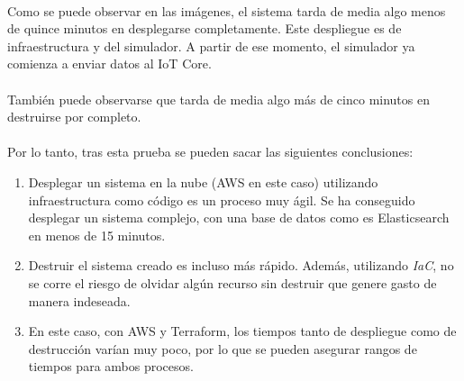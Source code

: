 \documentclass[../../memoria.tex]{subfiles}
\begin{document}
\paragraph{}
Como se puede observar en las imágenes, el sistema tarda de media algo menos de quince minutos en desplegarse completamente. Este despliegue es de infraestructura y del simulador. A partir de ese momento, el simulador ya comienza a enviar datos al IoT Core.

\paragraph{}
También puede observarse que tarda de media algo más de cinco minutos en destruirse por completo.

\paragraph{}
Por lo tanto, tras esta prueba se pueden sacar las siguientes conclusiones:

\begin{enumerate}
    \item Desplegar un sistema en la nube (AWS en este caso) utilizando infraestructura como código es un proceso muy ágil. Se ha conseguido desplegar un sistema complejo, con una base de datos como es Elasticsearch en menos de 15 minutos.
    \item Destruir el sistema creado es incluso más rápido. Además, utilizando \textit{IaC}, no se corre el riesgo de olvidar algún recurso sin destruir que genere gasto de manera indeseada.
    \item En este caso, con AWS y Terraform, los tiempos tanto de despliegue como de destrucción varían muy poco, por lo que se pueden asegurar rangos de tiempos para ambos procesos.
\end{enumerate}
\end{document}

